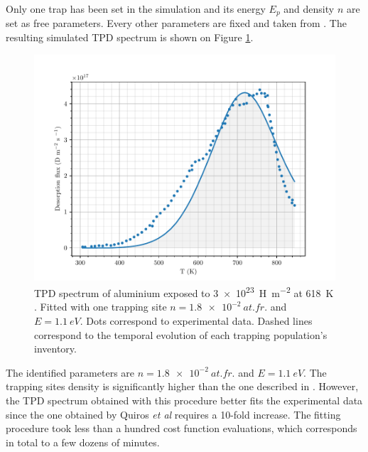 Only one trap has been set in the simulation and its energy $E_p$ and density $n$ are set as free parameters.
Every other parameters are fixed and taken from \cite{quiros_blister_2017, quiros_blistering_2019}.
The resulting simulated TPD spectrum is shown on Figure \ref{fig:TPD alu}.
\begin{figure} [ht]
    \centering
    \includegraphics[width=\linewidth]{Figures/Chapter3/Parametric_optimisation/alu_quiros.pdf}
    \caption{TPD spectrum of aluminium exposed to \SI{3e23}{H.m^{-2}} at \SI{618}{K} \cite{quiros_blister_2017, quiros_blistering_2019}. Fitted with one trapping site $n = \SI{1.8e-2}{at.fr.}$ and $E =\SI{1.1}{eV}$. Dots correspond to experimental data. Dashed lines correspond to the temporal evolution of each trapping population's inventory.}
    \label{fig:TPD alu}
\end{figure}


The identified parameters are $n = \SI{1.8e-2}{at.fr.}$ and $E =\SI{1.1}{eV}$.
The trapping sites density is significantly higher than the one described in \cite{quiros_blister_2017}.
However, the TPD spectrum obtained with this procedure better fits the experimental data since the one obtained by Quiros \textit{et al} requires a 10-fold increase.
The fitting procedure took less than a hundred cost function evaluations, which corresponds in total to a few dozens of minutes.

